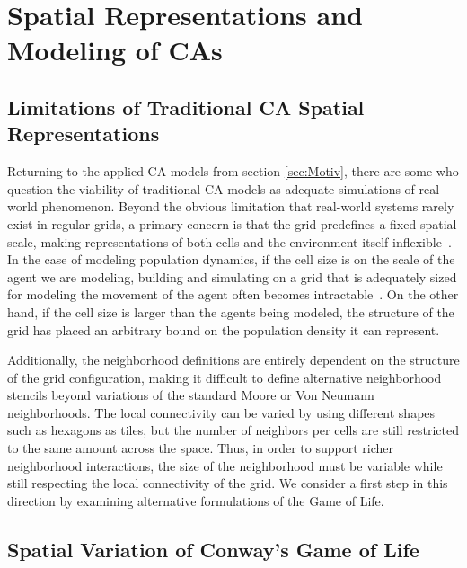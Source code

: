 \documentclass[a4paper,11pt]{report}
\begin{document}

\section{Spatial Representations and Modeling of CAs}
\label{sec:Model}
\subsection{Limitations of Traditional CA Spatial Representations}

Returning to the applied CA models from section \ref{sec:Motiv}, there are some who question the viability of traditional CA models as adequate simulations of real-world phenomenon. Beyond the obvious limitation that real-world systems rarely exist in regular grids, a primary concern is that the grid predefines a fixed spatial scale, making representations of both cells and the environment itself inflexible~\cite{he98}. In the case of modeling population dynamics, if the cell size is on the scale of the agent we are modeling, building and simulating on a grid that is adequately sized for modeling the movement of the agent often becomes intractable~\cite{bi07}. On the other hand, if the cell size is larger than the agents being modeled, the structure of the grid has placed an arbitrary bound on the population density it can represent.

Additionally, the neighborhood definitions are entirely dependent on the structure of the grid configuration, making it difficult to define alternative neighborhood stencils beyond variations of the standard Moore or Von Neumann neighborhoods. The local connectivity can be varied by using different shapes such as hexagons as tiles, but the number of neighbors per cells are still restricted to the same amount across the space. Thus, in order to support richer neighborhood interactions, the size of the neighborhood must be variable while still respecting the local connectivity of the grid. We consider a first step in this direction by examining alternative formulations of the Game of Life.


\subsection{Spatial Variation of Conway's Game of Life}
\end{document}
